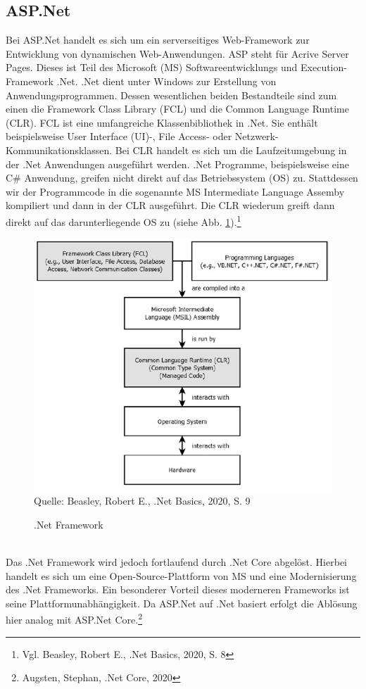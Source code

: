 \documentclass[a4paper,
12pt,
oneside]
{article}
\newcommand{\sPar}{\par\vspace*{6pt}}
\begin{document}
	\subsection{ASP.Net}
	Bei ASP.Net handelt es sich um ein serverseitiges Web-Framework zur Entwicklung von dynamischen Web-Anwendungen. ASP steht für \glqq Acrive Server Pages\grqq. Dieses ist Teil des Microsoft (MS) Softwareentwicklungs und Execution-Framework .Net. .Net dient unter Windows zur Erstellung von Anwendungsprogrammen. Dessen wesentlichen beiden Bestandteile sind zum einen die Framework Class Library (FCL) und die Common Language Runtime (CLR). FCL ist eine umfangreiche Klassenbibliothek in .Net. Sie enthält beispielsweise User Interface (UI)-, File Access- oder Netzwerk-Kommunikationsklassen. Bei CLR handelt es sich um die Laufzeitumgebung in der .Net Anwendungen ausgeführt werden. .Net Programme, beispielsweise eine C\# Anwendung, greifen nicht direkt auf das Betriebssystem (OS) zu. Stattdessen wir der Programmcode in die sogenannte  MS Intermediate Language Assemby kompiliert und dann in der CLR ausgeführt. Die CLR wiederum greift dann direkt auf das darunterliegende OS zu (siehe Abb. \ref{fig:dotnet}).\footnote{Vgl. Beasley, Robert E., .Net Basics, 2020, S. 8}
	\begin{figure}[h]
		\centering
		\caption{.Net Framework}
		\includegraphics[width=11.5cm]{img/dotnet.jpg} \\
		\vspace{5pt}
		\footnotesize{Quelle: Beasley, Robert E., .Net Basics, 2020, S. 9}
		\label{fig:dotnet}
	\end{figure} \\
	Das .Net Framework wird jedoch fortlaufend durch .Net Core abgelöst. Hierbei handelt es sich um eine Open-Source-Plattform von MS und eine Modernisierung des .Net Frameworks. Ein besonderer Vorteil dieses moderneren Frameworks ist seine Plattformunabhängigkeit. Da ASP.Net auf .Net basiert erfolgt die Ablösung hier analog mit ASP.Net Core.\footnote{Augsten, Stephan, .Net Core, 2020} \sPar
\end{document}
